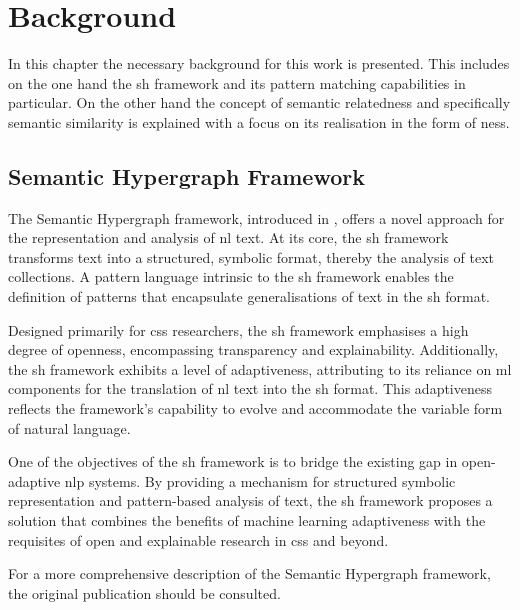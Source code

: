 \documentclass[11pt]{scrreprt}
\let\citef\cite  %
\let\cite\parencite  %
\begin{document}
\chapter{Background}

\label{cha:background}
In this chapter the necessary background for this work is presented. This includes on the one hand the \gls{sh} framework and its pattern matching capabilities in particular. On the other hand the concept of semantic relatedness and specifically semantic similarity is explained with a focus on its realisation in the form of \gls{ness}.

\section{Semantic Hypergraph Framework}
\label{sec:semantic-hypergraph-framework}

The Semantic Hypergraph framework, introduced in \citef{menezesSemanticHypergraphs2021}, offers a novel approach for the representation and analysis of \gls{nl} text. At its core, the \gls{sh} framework transforms text into a structured, symbolic format, thereby the analysis of text collections. A pattern language intrinsic to the \gls{sh} framework enables the definition of patterns that encapsulate generalisations of text in the \gls{sh} format.

Designed primarily for \gls{css} researchers, the \gls{sh} framework emphasises a high degree of openness, encompassing transparency and explainability. Additionally, the \gls{sh} framework exhibits a level of adaptiveness, attributing to its reliance on \gls{ml} components for the translation of \gls{nl} text into the \gls{sh} format. This adaptiveness reflects the framework's capability to evolve and accommodate the variable form of natural language.

One of the objectives of the \gls{sh} framework is to bridge the existing gap in open-adaptive \gls{nlp} systems. By providing a mechanism for structured symbolic representation and pattern-based analysis of text, the \gls{sh} framework proposes a solution that combines the benefits of machine learning adaptiveness with the requisites of open and explainable research in \gls{css} and beyond.

For a more comprehensive description of the Semantic Hypergraph framework, the original publication \cite{menezesSemanticHypergraphs2021} should be consulted.
\end{document}
